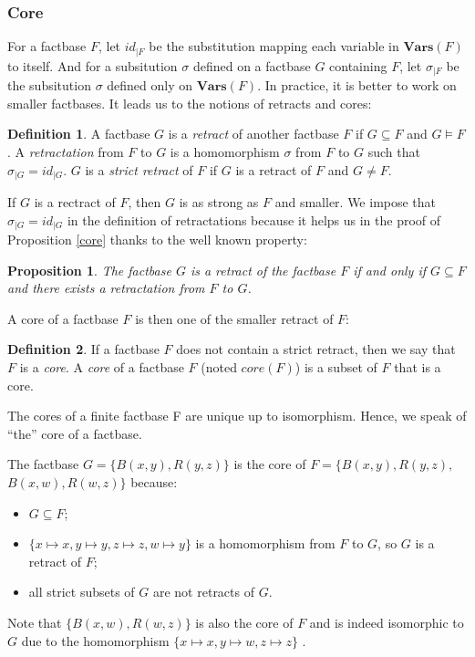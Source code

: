 \documentclass{article}
\newtheorem{proposition}{Proposition}[section]
\theoremstyle{definition}
\newtheorem{definition}{Definition}[section]
\theoremstyle{remark}
\newcommand{\Vars}{\textbf{Vars}}
\begin{document}
\subsubsection{Core}

For a factbase $F$, let $id_{|F}$ be the substitution mapping each variable in $\Vars(F)$ to itself. And for a subsitution $\sigma$ defined on a factbase $G$ containing $F$, let $\sigma_{|F}$ be the subsitution $\sigma$ defined only on $\Vars(F)$. In practice, it is better to work on smaller factbases. It leads us to the notions of retracts and cores:

\begin{definition}
A factbase $G$ is a \emph{retract} of another factbase $F$ if $G \subseteq F$ and $G \models F$. A \emph{retractation} from $F$ to $G$ is a homomorphism $\sigma$ from $F$ to $G$ such that $\sigma_{|G}=id_{|G}$. $G$ is a \emph{strict retract} of $F$ if $G$ is a retract of $F$ and $G \neq F$.
\end{definition}

If $G$ is a rectract of $F$, then $G$ is as strong as $F$ and smaller. We impose that $\sigma_{|G}=id_{|G}$ in the definition of retractations because it helps us in the proof of Proposition \ref{core} thanks to the well known property:


\begin{proposition} \label{retract}
The factbase $G$ is a retract of the factbase $F$ if and only if $G \subseteq F$  and there exists a retractation from $F$ to $G$.
\end{proposition}

A core of a factbase $F$ is then one of the smaller retract of $F$:

\begin{definition}
If a factbase $F$ does not contain a strict retract, then we say that $F$ is a \emph{core}. A \emph{core} of a factbase $F$ (noted \emph{$\textit{core}(F)$}) is a subset of $F$ that is a core.
\end{definition}

The cores of a finite factbase F are unique up to isomorphism. Hence, we speak of ``the'' core of a factbase.

The factbase $G = \{B(x,y),R(y,z)\}$ is the core of $F = \{B(x,y),R(y,z),$ $B(x,w),R(w,z)\}$ because:
\begin{itemize}
\item $G \subseteq F$;
\item $\{x \mapsto x, y \mapsto y, z \mapsto z, w \mapsto y\}$ is a homomorphism from $F$ to $G$, so $G$ is a retract of $F$;
\item all strict subsets of $G$ are not retracts of $G$.
\end{itemize}
Note that $ \{B(x,w),R(w,z)\}$ is also the core of $F$ and is indeed isomorphic to $G$ due to the homomorphism $\{x \mapsto x, y \mapsto w, z \mapsto z\}$ .
\end{document}
